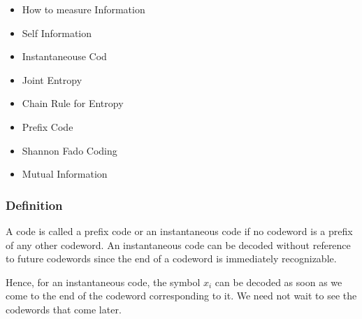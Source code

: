 
\begin{frame}
\begin{itemize}
	\item How to measure Information
	\item Self Information
	\item Instantaneouse Cod
	\item Joint Entropy
	\item Chain Rule for Entropy
	\item Prefix Code
	\item Shannon Fado Coding
	\item Mutual Information
\end{itemize}
\end{frame}


\begin{frame}

\frametitle{Definition} A code is called a prefix code or an instantaneous code if
no codeword is a prefix of any other codeword.
An instantaneous code can be decoded without reference to future codewords
since the end of a codeword is immediately recognizable. 

Hence,
for an instantaneous code, the symbol $x_i$ can be decoded as soon as we
come to the end of the codeword corresponding to it. We need not wait
to see the codewords that come later. 
\end{frame}


